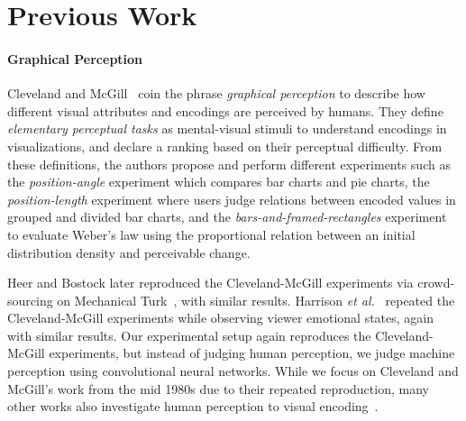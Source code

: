 \section{Previous Work}

\paragraph{Graphical Perception} Cleveland and McGill~\cite{cleveland_mcgill,cleveland1985graphical} coin the phrase \emph{graphical perception} to describe how different visual attributes and encodings are perceived by humans. They define \emph{elementary perceptual tasks} as mental-visual stimuli to understand encodings in visualizations, and declare a ranking based on their perceptual difficulty. From these definitions, the authors propose and perform different experiments such as the \emph{position-angle} experiment which compares bar charts and pie charts, the \emph{position-length} experiment where users judge relations between encoded values in grouped and divided bar charts, and the \emph{bars-and-framed-rectangles} experiment to evaluate Weber's law \cite{harrison2014_webers_law_rank} using the proportional relation between an initial distribution density and perceivable change.

Heer and Bostock later reproduced the Cleveland-McGill experiments via crowd-sourcing on Mechanical Turk~\cite{HeerBostock2010}, with similar results. Harrison \textit{et al.}~\cite{harrison2013influencing} repeated the Cleveland-McGill experiments while observing viewer emotional states, again with similar results. Our experimental setup again reproduces the Cleveland-McGill experiments, but instead of judging human perception, we judge machine perception using convolutional neural networks. While we focus on Cleveland and McGill's work from the mid 1980s due to their repeated reproduction, many other works also investigate human perception to visual encoding~\cite{mackinlay1988applying,bertin1967semiologie,treisman1988feature,carpendale2003considering,wilkinson2006grammar,widgor_perception2007,munzner2015visualization}.



